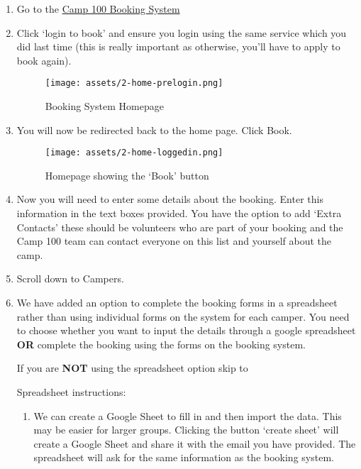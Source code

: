 \documentclass[a4paper, 11pt]{report}
\begin{document}
\begin{enumerate}
    \item Go to the \href{https://bookings.camp100.org.uk}{Camp 100 Booking System}
    \item Click `login to book' and ensure you login using the same service which you did last time (this is really important as otherwise, you'll have to apply to book again).
    \begin{figure}[H]
        \centering
        \texttt{[image: assets/2-home-prelogin.png]}
        \caption{Booking System Homepage}
    \end{figure}
    \item You will now be redirected back to the home page. Click Book.
    \begin{figure}[H]
        \centering
        \texttt{[image: assets/2-home-loggedin.png]}
        \caption{Homepage showing the `Book' button}
    \end{figure}
    \item Now you will need to enter some details about the booking. Enter this information in the text boxes provided. You have the option to add `Extra Contacts' these should be volunteers who are part of your booking and the Camp 100 team can contact everyone on this list and yourself about the camp.
    \item Scroll down to Campers.
    \item We have added an option to complete the booking forms in a spreadsheet rather than using individual forms on the system for each camper. You need to choose whether you want to input the details through a google spreadsheet \textbf{OR} complete the booking using the forms on the booking system. 
    
    If you are \textbf{NOT} using the spreadsheet option skip to 

    Spreadsheet instructions:
    \begin{enumerate}
        \item We can create a Google Sheet to fill in and then import the data. This may be easier for larger groups. Clicking the button `create sheet' will create a Google Sheet and share it with the email you have provided. The spreadsheet will ask for the same information as the booking system. 
        

\end{enumerate}
\end{enumerate}
\end{document}
